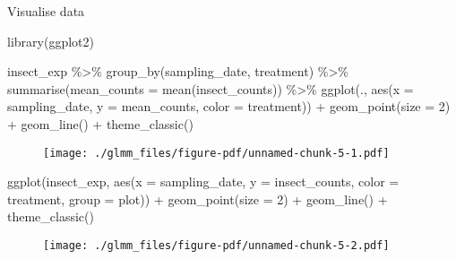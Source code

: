 \documentclass[
  letterpaper,
  DIV=11,
  numbers=noendperiod]{scrreprt}
\newenvironment{Shaded}{\begin{snugshade}}{\end{snugshade}}
\newcommand{\AttributeTok}[1]{\textcolor[rgb]{0.40,0.45,0.13}{#1}}
\newcommand{\DecValTok}[1]{\textcolor[rgb]{0.68,0.00,0.00}{#1}}
\newcommand{\FunctionTok}[1]{\textcolor[rgb]{0.28,0.35,0.67}{#1}}
\newcommand{\NormalTok}[1]{\textcolor[rgb]{0.00,0.23,0.31}{#1}}
\newcommand{\SpecialCharTok}[1]{\textcolor[rgb]{0.37,0.37,0.37}{#1}}
\begin{document}
Visualise data

\begin{Shaded}
\begin{Highlighting}[]
\FunctionTok{library}\NormalTok{(ggplot2) }

\NormalTok{insect\_exp }\SpecialCharTok{\%\textgreater{}\%} \FunctionTok{group\_by}\NormalTok{(sampling\_date, treatment) }\SpecialCharTok{\%\textgreater{}\%} 
  \FunctionTok{summarise}\NormalTok{(}\AttributeTok{mean\_counts =} \FunctionTok{mean}\NormalTok{(insect\_counts)) }\SpecialCharTok{\%\textgreater{}\%} 
  \FunctionTok{ggplot}\NormalTok{(., }\FunctionTok{aes}\NormalTok{(}\AttributeTok{x =}\NormalTok{ sampling\_date, }\AttributeTok{y =}\NormalTok{ mean\_counts, }\AttributeTok{color =}\NormalTok{ treatment)) }\SpecialCharTok{+}
    \FunctionTok{geom\_point}\NormalTok{(}\AttributeTok{size =} \DecValTok{2}\NormalTok{) }\SpecialCharTok{+}
    \FunctionTok{geom\_line}\NormalTok{() }\SpecialCharTok{+}
    \FunctionTok{theme\_classic}\NormalTok{()}
\end{Highlighting}
\end{Shaded}

\begin{figure}[H]

{\centering \texttt{[image: ./glmm\_files/figure-pdf/unnamed-chunk-5-1.pdf]}

}

\end{figure}

\begin{Shaded}
\begin{Highlighting}[]
\FunctionTok{ggplot}\NormalTok{(insect\_exp, }\FunctionTok{aes}\NormalTok{(}\AttributeTok{x =}\NormalTok{ sampling\_date, }\AttributeTok{y =}\NormalTok{ insect\_counts, }\AttributeTok{color =}\NormalTok{ treatment, }\AttributeTok{group =}\NormalTok{ plot)) }\SpecialCharTok{+}
  \FunctionTok{geom\_point}\NormalTok{(}\AttributeTok{size =} \DecValTok{2}\NormalTok{) }\SpecialCharTok{+}
  \FunctionTok{geom\_line}\NormalTok{() }\SpecialCharTok{+}
  \FunctionTok{theme\_classic}\NormalTok{()}
\end{Highlighting}
\end{Shaded}

\begin{figure}[H]

{\centering \texttt{[image: ./glmm\_files/figure-pdf/unnamed-chunk-5-2.pdf]}

}

\end{figure}
\end{document}
